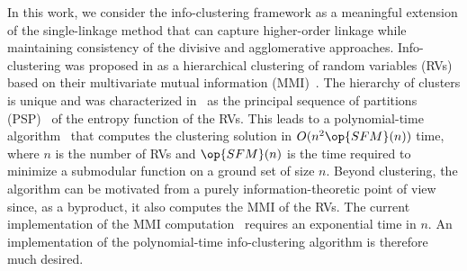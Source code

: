 In this work, we consider the info-clustering framework as a meaningful extension of the single-linkage method that can capture higher-order linkage while maintaining consistency of the divisive and agglomerative approaches. Info-clustering was proposed in \cite{chan16cluster} as a hierarchical
clustering of random variables (RVs) based on their multivariate mutual information (MMI)~\cite{chan15mi}.
The hierarchy of clusters is unique and was characterized in~\cite{chan16cluster} as the principal 
sequence of partitions (PSP)~\cite{narayanan90} of the entropy function of the RVs.  This leads to a
polynomial-time algorithm~\cite[Algorithm~3]{chan16cluster} that computes the clustering solution in
$O(n^2 \op{SFM}(n))$ time, where $n$ is the number of RVs and $\op {SFM}(n)$ is the time required to
minimize a submodular function on a ground set of size $n$.
%
Beyond clustering, the algorithm can be motivated from a purely information-theoretic point of view
since, as a byproduct, it also computes the MMI of the RVs. The current implementation of the MMI computation~\cite{james-dit} requires an exponential time in $n$. An implementation of the polynomial-time info-clustering algorithm is therefore much desired.
%
%
%
%
%

